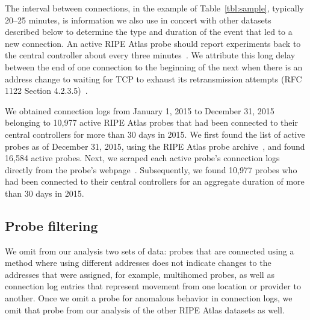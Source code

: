 The interval between connections, in the example of
Table~\ref{tbl:sample}, typically 20--25 minutes, is
information we also use in concert with other datasets
described below to determine the type and duration of the
event that led to a new connection.  An active RIPE Atlas probe
should report experiments back to the central controller
about every three minutes~\cite{homburg-ntp}. We attribute
this long delay between the end of one connection to the
beginning of the next when there is an address change to
waiting for TCP to exhaust its retransmission attempts
(RFC 1122 Section 4.2.3.5)~\cite{rfc1122}.


We obtained connection logs from January 1, 2015 to December 31, 2015
belonging to 10,977 active RIPE Atlas probes that had been connected
to their central controllers for more than 30 days in 2015. We first
found the list of active probes as of December 31, 2015, using the
RIPE Atlas probe archive~\cite{atlas-probe-archive}, and found 16,584
active probes. Next, we scraped each active probe's connection
logs directly from the probe's
webpage~\cite{atlas-connlogs-link-format}. Subsequently, we found
10,977 probes who had been connected to their central controllers for
an aggregate duration of more than 30 days in 2015.

\subsection{Probe filtering}

We omit from our analysis two sets of data: probes that are
connected using a method where using different addresses
does not indicate changes to the addresses that were
assigned, for example, multihomed probes, as well as
connection log entries that represent movement from one
location or provider to another.  Once we omit a probe for
anomalous behavior in connection logs, we omit that probe  
from our analysis of the other RIPE Atlas datasets as well.


